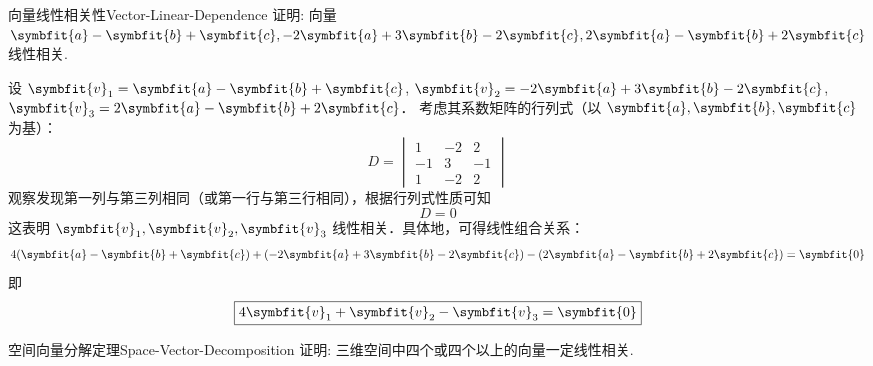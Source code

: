 \begin{problem}{向量线性相关性}{Vector-Linear-Dependence}
    证明: 向量 $\symbfit{a} - \symbfit{b} + \symbfit{c}, -2\symbfit{a} + 3\symbfit{b} - 2\symbfit{c}, 2\symbfit{a} - \symbfit{b} + 2\symbfit{c}$ 线性相关.
\end{problem}

\begin{myproof}
    设 $\symbfit{v}_1 = \symbfit{a} - \symbfit{b} + \symbfit{c}$, $\symbfit{v}_2 = -2\symbfit{a} + 3\symbfit{b} - 2\symbfit{c}$, $\symbfit{v}_3 = 2\symbfit{a} - \symbfit{b} + 2\symbfit{c}$．
    考虑其系数矩阵的行列式（以 $\symbfit{a}, \symbfit{b}, \symbfit{c}$ 为基）：
    \begin{equation}
        D = \begin{vmatrix} 1 & -2 & 2 \\ -1 & 3 & -1 \\ 1 & -2 & 2 \end{vmatrix}
    \end{equation}
    观察发现第一列与第三列相同（或第一行与第三行相同），根据行列式性质可知
    \begin{equation}
        D = 0
    \end{equation}
    这表明 $\symbfit{v}_1, \symbfit{v}_2, \symbfit{v}_3$ 线性相关．具体地，可得线性组合关系：
    \begin{equation}
        4(\symbfit{a} - \symbfit{b} + \symbfit{c}) + (-2\symbfit{a} + 3\symbfit{b} - 2\symbfit{c}) - (2\symbfit{a} - \symbfit{b} + 2\symbfit{c}) = \symbfit{0}
    \end{equation}
    即
    \begin{equation}
        \boxed{4\symbfit{v}_1 + \symbfit{v}_2 - \symbfit{v}_3 = \symbfit{0}}
    \end{equation}
\end{myproof}


\begin{problem}{空间向量分解定理}{Space-Vector-Decomposition}
    证明: 三维空间中四个或四个以上的向量一定线性相关.
\end{problem}

